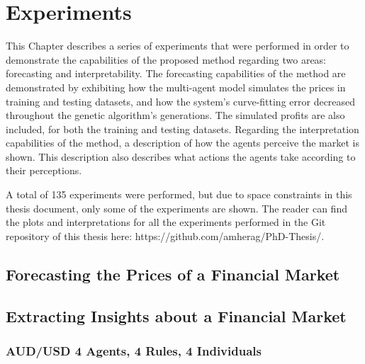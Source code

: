 \chapter{Experiments}
\label{chapter:experiments}

This Chapter describes a series of experiments that were performed in order to
demonstrate the capabilities of the proposed method regarding two areas:
forecasting and interpretability. The forecasting capabilities of the method are
demonstrated by exhibiting how the multi-agent model simulates the prices in
training and testing datasets, and how the system's curve-fitting error
decreased throughout the genetic algorithm's generations. The simulated profits
are also included, for both the training and testing datasets. Regarding the
interpretation capabilities of the method, a description of how the agents
perceive the market is shown. This description also describes what actions the
agents take according to their perceptions.

A total of 135 experiments were performed, but due to space constraints in this
thesis document, only some of the experiments are shown. The reader can find the
plots and interpretations for all the experiments performed in the Git repository of
this thesis here: https://github.com/amherag/PhD-Thesis/.


\section{Forecasting the Prices of a Financial Market}
\label{section:forecasting-the-prices-of-a-financial-market}



\section{Extracting Insights about a Financial Market}
\label{section:extracting-insights-about-a-financial-market}

\subsection{AUD/USD 4 Agents, 4 Rules, 4 Individuals}
\label{}


